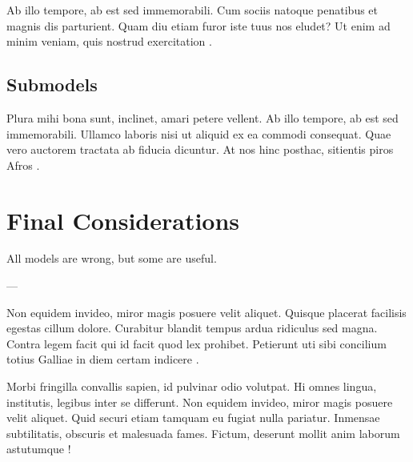 Ab illo tempore, ab est sed immemorabili. Cum sociis natoque penatibus et magnis dis parturient. Quam diu etiam furor iste tuus nos eludet? Ut enim ad minim veniam, quis nostrud exercitation \autocite{epstein1999}.

\section{Submodels}

Plura mihi bona sunt, inclinet, amari petere vellent. Ab illo tempore, ab est sed immemorabili. Ullamco laboris nisi ut aliquid ex ea commodi consequat. Quae vero auctorem tractata ab fiducia dicuntur. At nos hinc posthac, sitientis piros Afros \autocite{ballot2000}.


\chapter{Final Considerations}

\begingroup
  \setlength{}
  \epigraph{All models are wrong, but some are useful.}{--- \textcite{box1979}}
\endgroup

Non equidem invideo, miror magis posuere velit aliquet. Quisque placerat facilisis egestas cillum dolore. Curabitur blandit tempus ardua ridiculus sed magna. Contra legem facit qui id facit quod lex prohibet. Petierunt uti sibi concilium totius Galliae in diem certam indicere \autocite{gilbert2000}.

Morbi fringilla convallis sapien, id pulvinar odio volutpat. Hi omnes lingua, institutis, legibus inter se differunt. Non equidem invideo, miror magis posuere velit aliquet. Quid securi etiam tamquam eu fugiat nulla pariatur. Inmensae subtilitatis, obscuris et malesuada fames. Fictum, deserunt mollit anim laborum astutumque \autocite{epstein2006}!


\postextual

\begingroup
  \renewcommand{\baselinestretch}{1}
  \setcounter{footnote}{0}
  \renewcommand{\thefootnote}{\fnsymbol{footnote}}
  \printbibliography[heading=bibheading]
\endgroup

\tocskipone
\tocprintchapternonum
{}

